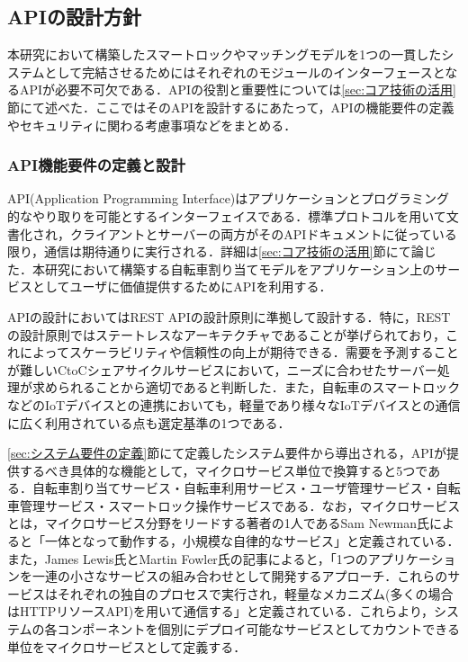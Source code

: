   \subsection{APIの設計方針}
    \label{sec:APIの設計方針}
      \par 本研究において構築したスマートロックやマッチングモデルを1つの一貫したシステムとして完結させるためにはそれぞれのモジュールのインターフェースとなるAPIが必要不可欠である．APIの役割と重要性については\ref{sec:コア技術の活用}節にて述べた．ここではそのAPIを設計するにあたって，APIの機能要件の定義やセキュリティに関わる考慮事項などをまとめる．
      
      \subsubsection{API機能要件の定義と設計}
        \label{sec:API機能要件の定義と設計}
          \par API(Application Programming Interface)はアプリケーションとプログラミング的なやり取りを可能とするインターフェイスである．標準プロトコルを用いて文書化され，クライアントとサーバーの両方がそのAPIドキュメントに従っている限り，通信は期待通りに実行される．詳細は\ref{sec:コア技術の活用}節にて論じた．本研究において構築する自転車割り当てモデルをアプリケーション上のサービスとしてユーザに価値提供するためにAPIを利用する．
          \par APIの設計においてはREST APIの設計原則に準拠して設計する．特に，RESTの設計原則ではステートレスなアーキテクチャであることが挙げられており，これによってスケーラビリティや信頼性の向上が期待できる．需要を予測することが難しいCtoCシェアサイクルサービスにおいて，ニーズに合わせたサーバー処理が求められることから適切であると判断した．また，自転車のスマートロックなどのIoTデバイスとの連携においても，軽量であり様々なIoTデバイスとの通信に広く利用されている点も選定基準の1つである．
          \par \ref{sec:システム要件の定義}節にて定義したシステム要件から導出される，APIが提供するべき具体的な機能として，マイクロサービス単位で換算すると5つである．自転車割り当てサービス・自転車利用サービス・ユーザ管理サービス・自転車管理サービス・スマートロック操作サービスである．なお，マイクロサービスとは，マイクロサービス分野をリードする著者の1人であるSam Newman氏によると「一体となって動作する，小規模な自律的なサービス」と定義されている．また，James Lewis氏とMartin Fowler氏の記事によると，「1つのアプリケーションを一連の小さなサービスの組み合わせとして開発するアプローチ．これらのサービスはそれぞれの独自のプロセスで実行され，軽量なメカニズム(多くの場合はHTTPリソースAPI)を用いて通信する」と定義されている．これらより，システムの各コンポーネントを個別にデプロイ可能なサービスとしてカウントできる単位をマイクロサービスとして定義する．
